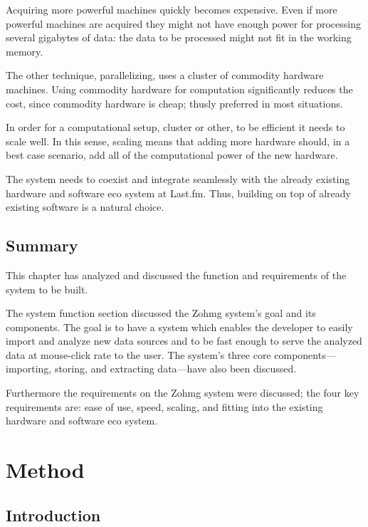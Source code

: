 Acquiring more powerful machines quickly becomes expensive. Even if more
powerful machines are acquired they might not have enough power for processing
several gigabytes of data: the data to be processed might not fit in the working
memory.

The other technique, parallelizing, uses a cluster of commodity hardware
machines. Using commodity hardware for computation significantly reduces the
cost, since commodity hardware is cheap; thusly preferred in most situations.

In order for a computational setup, cluster or other, to be efficient it needs
to scale well. In this sense, scaling means that adding more hardware should, in
a best case scenario, add all of the computational power of the new hardware.

The system needs to coexist and integrate seamlessly with the already existing
hardware and software eco system at Last.fm. Thus, building on top of already
existing software is a natural choice.


\section*{Summary}

This chapter has analyzed and discussed the function and requirements of the
system to be built.

The system function section discussed the Zohmg system's goal and its
components. The goal is to have a system which enables the developer to easily
import and analyze new data sources and to be fast enough to serve the analyzed
data at mouse-click rate to the user. The system's three core
components---importing, storing, and extracting data---have also been
discussed.

Furthermore the requirements on the Zohmg system were discussed; the four key
requirements are: ease of use, speed, scaling, and fitting into the existing
hardware and software eco system.



\chapter{Method}



\section*{Introduction}

